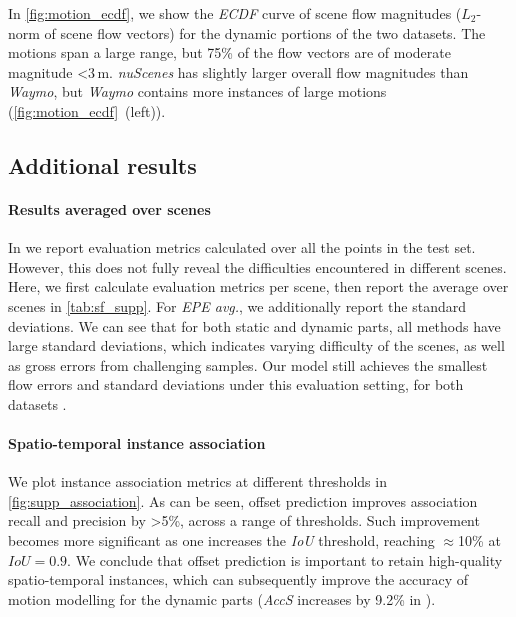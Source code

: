 In \cref{fig:motion_ecdf}, we show the \textit{ECDF} curve of scene flow magnitudes ($L_2$-norm of scene flow vectors) for the dynamic portions of the two datasets. The motions span a large range, but 75\% of the flow vectors are of moderate magnitude \textless3$\,$m. \emph{nuScenes} has slightly larger overall flow magnitudes than \emph{Waymo}, but \emph{Waymo} contains more instances of large motions (\cref{fig:motion_ecdf}~(left)).

\subsection{Additional results}
\label{sec:supp_quan}
\paragraph{Results averaged over scenes}

In  we report evaluation metrics calculated over all the points in the test set. However, this does not fully reveal the difficulties encountered in different scenes. Here, we first calculate evaluation metrics per scene, then report the average over scenes in \cref{tab:sf_supp}. For \textit{EPE avg.}, we additionally report the standard deviations. We can see that for both static and dynamic parts, all methods have large standard deviations, which indicates varying difficulty of the scenes, as well as gross errors from challenging samples. Our model still achieves the smallest flow errors and standard deviations under this evaluation setting, for both datasets . 


\paragraph{Spatio-temporal instance association}

We plot instance association metrics at different thresholds in \cref{fig:supp_association}. As can be seen, offset prediction improves association recall and precision by \textgreater5\%, across a range of thresholds. Such improvement becomes more significant as one increases the \textit{IoU} threshold, reaching $\approx$10\% at $IoU=0.9$. We conclude that offset prediction is important to retain high-quality spatio-temporal instances, which can subsequently improve the accuracy of motion modelling for the dynamic parts (\textit{AccS} increases by 9.2\%  in ).



